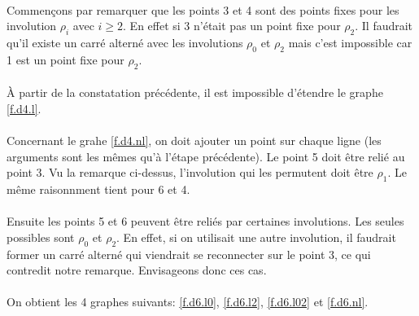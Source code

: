 \documentclass[a4paper]{article}
\theoremstyle{mytheorem}
\begin{document}
\paragraph{}
Commençons par remarquer que les points 3 et 4 sont des points fixes pour les involution $\rho_i$ avec $i \ge 2$. En effet si 3 n'était pas un point fixe pour $\rho_2$. Il faudrait qu'il existe un carré alterné avec les involutions $\rho_0$ et $\rho_2$ mais c'est impossible car 1 est un point fixe pour $\rho_2$.

\paragraph{}
À partir de la constatation précédente, il est impossible d'étendre le graphe \ref{f.d4.l}.

\paragraph{}
Concernant le grahe \ref{f.d4.nl}, on doit ajouter un point sur chaque ligne (les arguments sont les mêmes qu'à l'étape précédente). Le point 5 doit être relié au point 3. Vu la remarque ci-dessus, l'involution qui les permutent doit être $\rho_1$. Le même raisonnment tient pour 6 et 4.

\paragraph{}
Ensuite les points 5 et 6 peuvent être reliés par certaines involutions. Les seules possibles sont $\rho_0$ et $\rho_2$. En effet, si on utilisait une autre involution, il faudrait former un carré alterné qui viendrait se reconnecter sur le point 3, ce qui contredit notre remarque. Envisageons donc ces cas.

\paragraph{}
On obtient les 4 graphes suivants: \ref{f.d6.l0}, \ref{f.d6.l2}, \ref{f.d6.l02} et \ref{f.d6.nl}.
\end{document}
